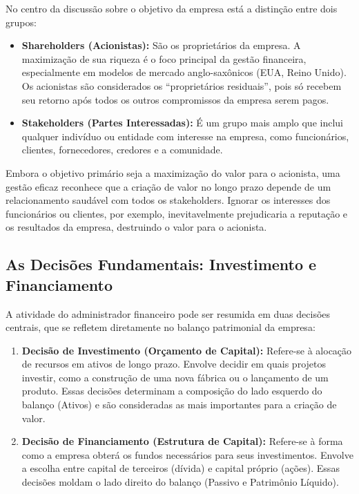 \documentclass[
  a4paper,
]{book}
\providecommand{\tightlist}{%
  \setlength{\itemsep}{0pt}\setlength{\parskip}{0pt}}\usepackage{longtable,booktabs,array}
\begin{document}
No centro da discussão sobre o objetivo da empresa está a distinção
entre dois grupos:

\begin{itemize}
\tightlist
\item
  \textbf{Shareholders (Acionistas):} São os proprietários da empresa. A
  maximização de sua riqueza é o foco principal da gestão financeira,
  especialmente em modelos de mercado anglo-saxônicos (EUA, Reino
  Unido). Os acionistas são considerados os ``proprietários residuais'',
  pois só recebem seu retorno após todos os outros compromissos da
  empresa serem pagos.
\item
  \textbf{Stakeholders (Partes Interessadas):} É um grupo mais amplo que
  inclui qualquer indivíduo ou entidade com interesse na empresa, como
  funcionários, clientes, fornecedores, credores e a comunidade.
\end{itemize}

Embora o objetivo primário seja a maximização do valor para o acionista,
uma gestão eficaz reconhece que a criação de valor no longo prazo
depende de um relacionamento saudável com todos os stakeholders. Ignorar
os interesses dos funcionários ou clientes, por exemplo, inevitavelmente
prejudicaria a reputação e os resultados da empresa, destruindo o valor
para o acionista.

\subsection{As Decisões Fundamentais: Investimento e
Financiamento}\label{as-decisuxf5es-fundamentais-investimento-e-financiamento}

A atividade do administrador financeiro pode ser resumida em duas
decisões centrais, que se refletem diretamente no balanço patrimonial da
empresa:

\begin{enumerate}
\def\labelenumi{\arabic{enumi}.}
\tightlist
\item
  \textbf{Decisão de Investimento (Orçamento de Capital):} Refere-se à
  alocação de recursos em ativos de longo prazo. Envolve decidir em
  quais projetos investir, como a construção de uma nova fábrica ou o
  lançamento de um produto. Essas decisões determinam a composição do
  lado esquerdo do balanço (Ativos) e são consideradas as mais
  importantes para a criação de valor.
\item
  \textbf{Decisão de Financiamento (Estrutura de Capital):} Refere-se à
  forma como a empresa obterá os fundos necessários para seus
  investimentos. Envolve a escolha entre capital de terceiros (dívida) e
  capital próprio (ações). Essas decisões moldam o lado direito do
  balanço (Passivo e Patrimônio Líquido).
\end{enumerate}
\end{document}
